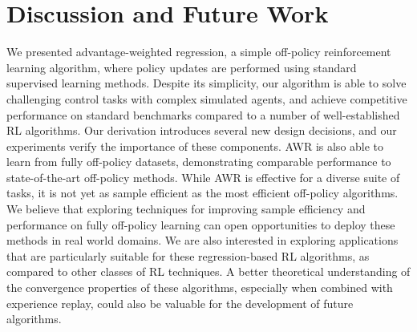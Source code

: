 \section{Discussion and Future Work} We presented advantage-weighted regression, a simple off-policy reinforcement learning algorithm, where policy updates are performed using standard supervised learning methods. Despite its simplicity, our algorithm is able to solve challenging control tasks with complex simulated agents, and achieve competitive performance on standard benchmarks compared to a number of well-established RL algorithms. Our derivation introduces several new design decisions, and our experiments verify the importance of these components. AWR is also able to learn from fully off-policy datasets, demonstrating comparable performance to state-of-the-art off-policy methods. While AWR is effective for a diverse suite of tasks, it is not yet as sample efficient as the most efficient off-policy algorithms. We believe that exploring techniques for improving sample efficiency and performance on fully off-policy learning can open opportunities to deploy these methods in real world domains. We are also interested in exploring applications that are particularly suitable for these regression-based RL algorithms, as compared to other classes of RL techniques. A better theoretical understanding of the convergence properties of these algorithms, especially when combined with experience replay, could also be valuable for the development of future algorithms.


